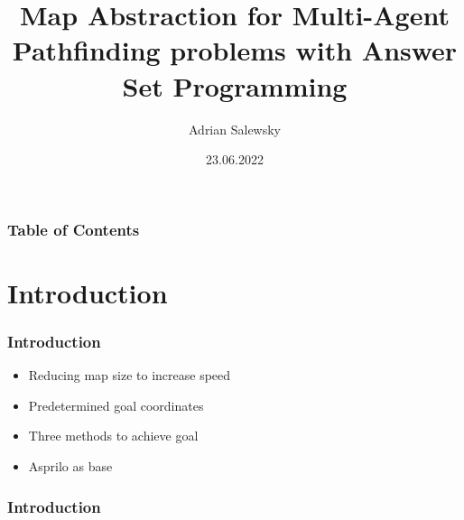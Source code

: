 \documentclass{beamer}
\title{Map Abstraction for Multi-Agent Pathfinding problems with Answer Set Programming}
\author[Adrian Salewsky]{Adrian Salewsky}
\institute{University of Potsdam}
\date{23.06.2022}
\begin{document}
\frame{\titlepage}

\begin{frame}
\frametitle{Table of Contents}
\tableofcontents
\end{frame}

\section{Introduction} 
\begin{frame}
\frametitle{Introduction}
\begin{itemize}
\item<2-> Reducing map size to increase speed
\medskip
\item<3-> Predetermined goal coordinates
\medskip
\item<4-> Three methods to achieve goal
\medskip
\item<5-> Asprilo as base
\end{itemize}
\end{frame}

\begin{frame}
\frametitle{Introduction}
\begin{figure}[h]
\end{figure}
\end{frame}
\end{document}
